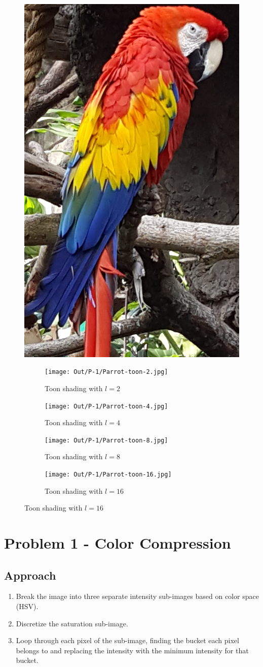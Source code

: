 \documentclass[dvipsnames]{article}
\begin{document}
\begin{figure}[H]
	\centering\includegraphics[height=.5\linewidth]{Images/P-1/Parrot.jpg}
	\caption{Original Parrot.jpg}

	\begin{subfigure}{.33\linewidth}
		\centering\texttt{[image: Out/P-1/Parrot-toon-2.jpg]}
		\caption{Toon shading with $l = 2$}
	\end{subfigure}
	\begin{subfigure}{.33\linewidth}
		\centering\texttt{[image: Out/P-1/Parrot-toon-4.jpg]}
		\caption{Toon shading with $l = 4$}
	\end{subfigure}
	\begin{subfigure}{.33\linewidth}
		\centering\texttt{[image: Out/P-1/Parrot-toon-8.jpg]}
		\caption{Toon shading with $l = 8$}
	\end{subfigure}
	\begin{subfigure}{.33\linewidth}
		\centering\texttt{[image: Out/P-1/Parrot-toon-16.jpg]}
		\caption{Toon shading with $l = 16$}
	\end{subfigure}
\end{figure}

\section*{Problem 1 - Color Compression}
\subsection*{Approach}
\begin{enumerate}
	\item Break the image into three separate intensity sub-images based on color space (HSV).
	\item Discretize the saturation sub-image.
	\item Loop through each pixel of the sub-image, finding the bucket each pixel belongs to and replacing the intensity with the minimum intensity for that bucket.
\end{enumerate}
\end{document}
